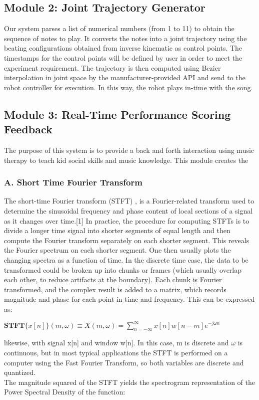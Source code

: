 \subsection{Module 2: Joint Trajectory Generator}
Our system parses a list of numerical numbers (from 1 to 11) to obtain the sequence
of notes to play. It converts the notes into a joint trajectory using the beating
configurations obtained from inverse kinematic as control points. The timestamps
for the control points will be defined by user in order to meet the experiment requirement.
The trajectory is then computed using Bezier interpolation in joint space by the
manufacturer-provided API and send to the robot controller for execution. In this
way, the robot plays in-time with the song.\\


\subsection{Module 3: Real-Time Performance Scoring Feedback}
The purpose of this system is to provide a back and forth interaction using music 
therapy to teach kid social skills and music knowledge. This module creates the 

\subsubsection{A. Short Time Fourier Transform}
The short-time Fourier transform (STFT) , is a Fourier-related 
transform used to determine the sinusoidal frequency and phase content of local 
sections of a signal as it changes over time.[1] In practice, the procedure for 
computing STFTs is to divide a longer time signal into shorter segments of equal 
length and then compute the Fourier transform separately on each shorter segment. 
This reveals the Fourier spectrum on each shorter segment. One then usually plots 
the changing spectra as a function of time.
In the discrete time case, the data to be transformed could be broken up into chunks 
or frames (which usually overlap each other, to reduce artifacts at the boundary). 
Each chunk is Fourier transformed, and the complex result is added to a matrix, which 
records magnitude and phase for each point in time and frequency. This can be expressed as:

${\displaystyle \mathbf {STFT} \{x[n]\}(m,\omega )\equiv X(m,\omega )=\sum _{n=-\infty }^{\infty }x[n]w[n-m]e^{-j\omega n}}$

likewise, with signal x[n] and window w[n]. In this case, m is discrete and $\omega$ 
is continuous, but in most typical applications the STFT is performed on a computer 
using the Fast Fourier Transform, so both variables are discrete and quantized.\\
The magnitude squared of the STFT yields the spectrogram representation of the Power Spectral Density of the function:

